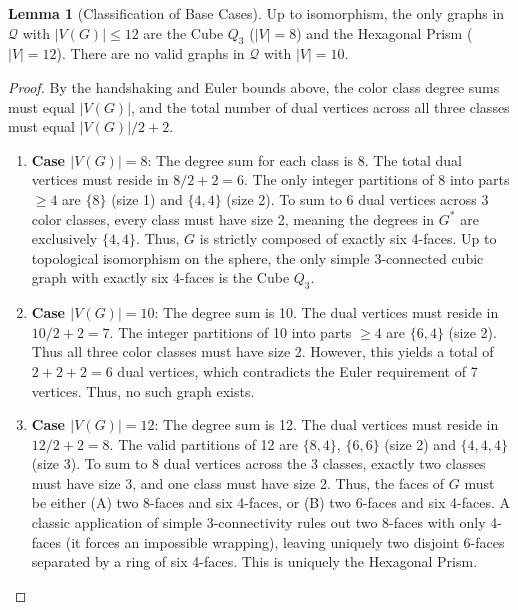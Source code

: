 \documentclass[12pt]{article}
\theoremstyle{definition}
\newtheorem{lemma}[theorem]{Lemma}
\begin{document}
\begin{lemma}[Classification of Base Cases]
\label{lem:base_case_classification}
Up to isomorphism, the only graphs in $\mathcal{Q}$ with $|V(G)| \le 12$ are the Cube $Q_3$ ($|V|=8$) and the Hexagonal Prism ($|V|=12$). There are no valid graphs in $\mathcal{Q}$ with $|V|=10$.
\end{lemma}
\begin{proof}
By the handshaking and Euler bounds above, the color class degree sums must equal $|V(G)|$, and the total number of dual vertices across all three classes must equal $|V(G)|/2 + 2$.
\begin{enumerate}
    \item \textbf{Case $|V(G)| = 8$}: The degree sum for each class is 8. The total dual vertices must reside in $8/2 + 2 = 6$. The only integer partitions of 8 into parts $\ge 4$ are $\{8\}$ (size 1) and $\{4, 4\}$ (size 2). To sum to 6 dual vertices across 3 color classes, every class must have size 2, meaning the degrees in $G^*$ are exclusively $\{4, 4\}$. Thus, $G$ is strictly composed of exactly six 4-faces. Up to topological isomorphism on the sphere, the only simple 3-connected cubic graph with exactly six 4-faces is the Cube $Q_3$.
    
    \item \textbf{Case $|V(G)| = 10$}: The degree sum is 10. The dual vertices must reside in $10/2 + 2 = 7$. The integer partitions of 10 into parts $\ge 4$ are $\{6, 4\}$ (size 2). Thus all three color classes must have size 2. However, this yields a total of $2 + 2 + 2 = 6$ dual vertices, which contradicts the Euler requirement of 7 vertices. Thus, no such graph exists.
    
    \item \textbf{Case $|V(G)| = 12$}: The degree sum is 12. The dual vertices must reside in $12/2 + 2 = 8$. The valid partitions of 12 are $\{8, 4\}$, $\{6, 6\}$ (size 2) and $\{4, 4, 4\}$ (size 3). To sum to 8 dual vertices across the 3 classes, exactly two classes must have size 3, and one class must have size 2. Thus, the faces of $G$ must be either (A) two 8-faces and six 4-faces, or (B) two 6-faces and six 4-faces. A classic application of simple 3-connectivity rules out two 8-faces with only 4-faces (it forces an impossible wrapping), leaving uniquely two disjoint 6-faces separated by a ring of six 4-faces. This is uniquely the Hexagonal Prism.
\end{enumerate}
\end{proof}
\end{document}
